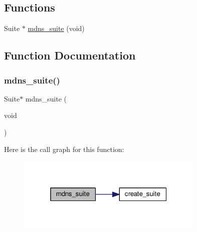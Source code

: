 \subsection*{Functions}
\begin{DoxyCompactItemize}
\item 
Suite $\ast$ \hyperlink{openmote-cc2538_2lwip_2test_2unit_2mdns_2test__mdns_8h_a1d903e1e66a36be7dd9b29c1a539dd56}{mdns\+\_\+suite} (void)
\end{DoxyCompactItemize}


\subsection{Function Documentation}
\mbox{\label{openmote-cc2538_2lwip_2test_2unit_2mdns_2test__mdns_8h_a1d903e1e66a36be7dd9b29c1a539dd56}} 
\subsubsection{\texorpdfstring{mdns\+\_\+suite()}{mdns\_suite()}}
{\footnotesize\ttfamily Suite$\ast$ mdns\+\_\+suite (\begin{DoxyParamCaption}\item[{void}]{ }\end{DoxyParamCaption})}

Here is the call graph for this function\+:
\nopagebreak
\begin{figure}[H]
\begin{center}
\leavevmode
\includegraphics[width=253pt]{openmote-cc2538_2lwip_2test_2unit_2mdns_2test__mdns_8h_a1d903e1e66a36be7dd9b29c1a539dd56_cgraph}
\end{center}
\end{figure}
